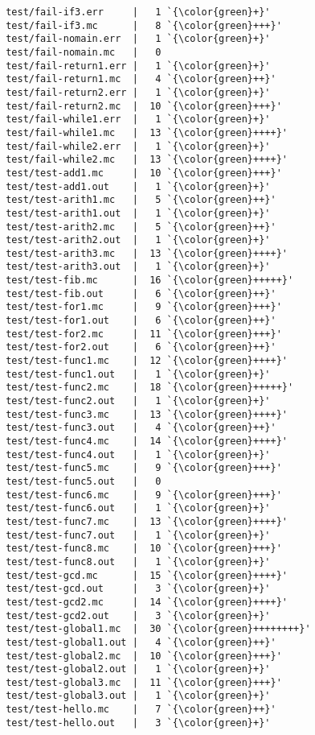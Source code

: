 \begin{lstlisting}
 test/fail-if3.err     |   1 `{\color{green}+}'
 test/fail-if3.mc      |   8 `{\color{green}+++}'
 test/fail-nomain.err  |   1 `{\color{green}+}'
 test/fail-nomain.mc   |   0
 test/fail-return1.err |   1 `{\color{green}+}'
 test/fail-return1.mc  |   4 `{\color{green}++}'
 test/fail-return2.err |   1 `{\color{green}+}'
 test/fail-return2.mc  |  10 `{\color{green}+++}'
 test/fail-while1.err  |   1 `{\color{green}+}'
 test/fail-while1.mc   |  13 `{\color{green}++++}'
 test/fail-while2.err  |   1 `{\color{green}+}'
 test/fail-while2.mc   |  13 `{\color{green}++++}'
 test/test-add1.mc     |  10 `{\color{green}+++}'
 test/test-add1.out    |   1 `{\color{green}+}'
 test/test-arith1.mc   |   5 `{\color{green}++}'
 test/test-arith1.out  |   1 `{\color{green}+}'
 test/test-arith2.mc   |   5 `{\color{green}++}'
 test/test-arith2.out  |   1 `{\color{green}+}'
 test/test-arith3.mc   |  13 `{\color{green}++++}'
 test/test-arith3.out  |   1 `{\color{green}+}'
 test/test-fib.mc      |  16 `{\color{green}+++++}'
 test/test-fib.out     |   6 `{\color{green}++}'
 test/test-for1.mc     |   9 `{\color{green}+++}'
 test/test-for1.out    |   6 `{\color{green}++}'
 test/test-for2.mc     |  11 `{\color{green}+++}'
 test/test-for2.out    |   6 `{\color{green}++}'
 test/test-func1.mc    |  12 `{\color{green}++++}'
 test/test-func1.out   |   1 `{\color{green}+}'
 test/test-func2.mc    |  18 `{\color{green}+++++}'
 test/test-func2.out   |   1 `{\color{green}+}'
 test/test-func3.mc    |  13 `{\color{green}++++}'
 test/test-func3.out   |   4 `{\color{green}++}'
 test/test-func4.mc    |  14 `{\color{green}++++}'
 test/test-func4.out   |   1 `{\color{green}+}'
 test/test-func5.mc    |   9 `{\color{green}+++}'
 test/test-func5.out   |   0
 test/test-func6.mc    |   9 `{\color{green}+++}'
 test/test-func6.out   |   1 `{\color{green}+}'
 test/test-func7.mc    |  13 `{\color{green}++++}'
 test/test-func7.out   |   1 `{\color{green}+}'
 test/test-func8.mc    |  10 `{\color{green}+++}'
 test/test-func8.out   |   1 `{\color{green}+}'
 test/test-gcd.mc      |  15 `{\color{green}++++}'
 test/test-gcd.out     |   3 `{\color{green}+}'
 test/test-gcd2.mc     |  14 `{\color{green}++++}'
 test/test-gcd2.out    |   3 `{\color{green}+}'
 test/test-global1.mc  |  30 `{\color{green}++++++++}'
 test/test-global1.out |   4 `{\color{green}++}'
 test/test-global2.mc  |  10 `{\color{green}+++}'
 test/test-global2.out |   1 `{\color{green}+}'
 test/test-global3.mc  |  11 `{\color{green}+++}'
 test/test-global3.out |   1 `{\color{green}+}'
 test/test-hello.mc    |   7 `{\color{green}++}'
 test/test-hello.out   |   3 `{\color{green}+}'

\end{lstlisting}
